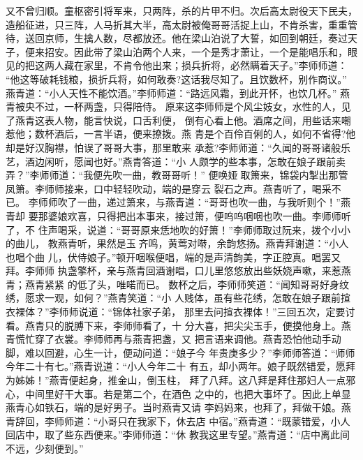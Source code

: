 又不曾归顺。童枢密引将军来，只两阵，杀的片甲不归。次后高太尉役天下民夫，
造船征进，只三阵，人马折其大半，高太尉被俺哥哥活捉上山，不肯杀害，重重管
待，送回京师，生擒人数，尽都放还。他在梁山泊说了大誓，如回到朝廷，奏过天
子，便来招安。因此带了梁山泊两个人来，一个是秀才萧让，一个是能唱乐和，眼
见的把这两人藏在家里，不肯令他出来；损兵折将，必然瞒着天子。”李师师道：
“他这等破耗钱粮，损折兵将，如何敢奏?这话我尽知了。且饮数杯，别作商议。”
燕青道：“小人天性不能饮酒。”李师师道：“路远风霜，到此开怀，也饮几杯。”
燕青被央不过，一杯两盏，只得陪侍。
原来这李师师是个风尘妓女，水性的人，见了燕青这表人物，能言快说，口舌利便，
倒有心看上他。酒席之间，用些话来嘲惹他；数杯酒后，一言半语，便来撩拨。燕
青是个百伶百俐的人，如何不省得?他却是好汉胸襟，怕误了哥哥大事，那里敢来
承惹?李师师道：“久闻的哥哥诸般乐艺，酒边闲听，愿闻也好。”燕青答道：“小
人颇学的些本事，怎敢在娘子跟前卖弄？”李师师道：“我便先吹一曲，教哥哥听！”
便唤娅取箫来，锦袋内掣出那管凤箫。李师师接来，口中轻轻吹动，端的是穿云
裂石之声。燕青听了，喝采不已。
李师师吹了一曲，递过箫来，与燕青道：“哥哥也吹一曲，与我听则个！”燕青却
要那婆娘欢喜，只得把出本事来，接过箫，便呜呜咽咽也吹一曲。李师师听了，不
住声喝采，说道：“哥哥原来恁地吹的好箫！”李师师取过阮来，拨个小小的曲儿，
教燕青听，果然是玉齐鸣，黄莺对啭，余韵悠扬。燕青拜谢道：“小人也唱个曲
儿，伏侍娘子。”顿开咽喉便唱，端的是声清韵美，字正腔真。唱罢又拜。李师师
执盏擎杯，亲与燕青回酒谢唱，口儿里悠悠放出些妖娆声嗽，来惹燕青；燕青紧紧
的低了头，唯喏而已。
数杯之后，李师师笑道：“闻知哥哥好身纹绣，愿求一观，如何？”燕青笑道：“小
人贱体，虽有些花绣，怎敢在娘子跟前揎衣裸体？”李师师说道：“锦体社家子弟，
那里去问揎衣裸体！”三回五次，定要讨看。燕青只的脱膊下来，李师师看了，十
分大喜，把尖尖玉手，便摸他身上。燕青慌忙穿了衣裳。李师师再与燕青把盏，又
把言语来调他。燕青恐怕他动手动脚，难以回避，心生一计，便动问道：“娘子今
年贵庚多少？”李师师答道：“师师今年二十有七。”燕青说道：“小人今年二十
有五，却小两年。娘子既然错爱，愿拜为姊姊！”燕青便起身，推金山，倒玉柱，
拜了八拜。这八拜是拜住那妇人一点邪心，中间里好干大事。若是第二个，在酒色
之中的，也把大事坏了。因此上单显燕青心如铁石，端的是好男子。当时燕青又请
李妈妈来，也拜了，拜做干娘。燕青辞回，李师师道：“小哥只在我家下，休去店
中宿。”燕青道：“既蒙错爱，小人回店中，取了些东西便来。”李师师道：“休
教我这里专望。”燕青道：“店中离此间不远，少刻便到。”

